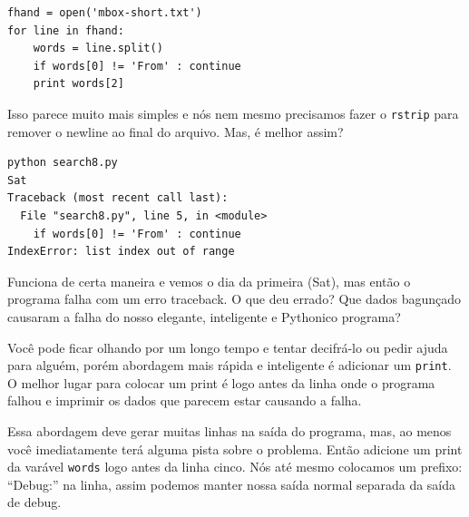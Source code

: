 \begin{enumerate}

\beforeverb
\begin{verbatim}
fhand = open('mbox-short.txt')
for line in fhand:
    words = line.split()
    if words[0] != 'From' : continue
    print words[2]
\end{verbatim}
\afterverb
%
Isso parece muito mais simples e nós nem mesmo precisamos fazer o
{\tt rstrip} para remover o newline ao final do arquivo.
Mas, é melhor assim?

\beforeverb
\begin{verbatim}
python search8.py 
Sat
Traceback (most recent call last):
  File "search8.py", line 5, in <module>
    if words[0] != 'From' : continue
IndexError: list index out of range
\end{verbatim}
\afterverb
%
Funciona de certa maneira e vemos o dia da primeira
(Sat), mas então o programa falha com um erro traceback.
O que deu errado? Que dados bagunçado causaram a falha do
nosso elegante, inteligente e Pythonico programa?


Você pode ficar olhando por um longo tempo e tentar decifrá-lo ou
pedir ajuda para alguém, porém abordagem mais rápida e inteligente
é adicionar um {\tt print}. O melhor lugar para colocar um print é
logo antes da linha onde o programa falhou e imprimir os dados que 
parecem estar causando a falha.



Essa abordagem deve gerar muitas linhas na saída do programa,
mas, ao menos você imediatamente terá alguma pista sobre o problema.
Então adicione um print da varável {\tt words} logo antes da linha cinco.
Nós até mesmo colocamos um prefixo: ``Debug:'' na linha, assim podemos 
manter nossa saída normal separada da saída de debug.


\end{enumerate}
